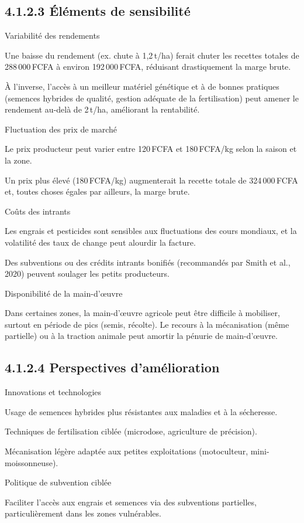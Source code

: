 \documentclass[12pt,oneside]{report}
\begin{document}
\subsection{4.1.2.3 Éléments de sensibilité}
Variabilité des rendements

Une baisse du rendement (ex. chute à 1,2 t/ha) ferait chuter les recettes totales de 288 000 FCFA à environ 192 000 FCFA, réduisant drastiquement la marge brute.

À l’inverse, l’accès à un meilleur matériel génétique et à de bonnes pratiques (semences hybrides de qualité, gestion adéquate de la fertilisation) peut amener le rendement au-delà de 2 t/ha, améliorant la rentabilité.

Fluctuation des prix de marché

Le prix producteur peut varier entre 120 FCFA et 180 FCFA/kg selon la saison et la zone.

Un prix plus élevé (180 FCFA/kg) augmenterait la recette totale de 324 000 FCFA et, toutes choses égales par ailleurs, la marge brute.

Coûts des intrants

Les engrais et pesticides sont sensibles aux fluctuations des cours mondiaux, et la volatilité des taux de change peut alourdir la facture.

Des subventions ou des crédits intrants bonifiés (recommandés par Smith et al., 2020) peuvent soulager les petits producteurs.

Disponibilité de la main-d’œuvre

Dans certaines zones, la main-d’œuvre agricole peut être difficile à mobiliser, surtout en période de pics (semis, récolte). Le recours à la mécanisation (même partielle) ou à la traction animale peut amortir la pénurie de main-d’œuvre.

\subsection{4.1.2.4 Perspectives d’amélioration}
Innovations et technologies

Usage de semences hybrides plus résistantes aux maladies et à la sécheresse.

Techniques de fertilisation ciblée (microdose, agriculture de précision).

Mécanisation légère adaptée aux petites exploitations (motoculteur, mini-moissonneuse).

Politique de subvention ciblée

Faciliter l’accès aux engrais et semences via des subventions partielles, particulièrement dans les zones vulnérables.
\end{document}
